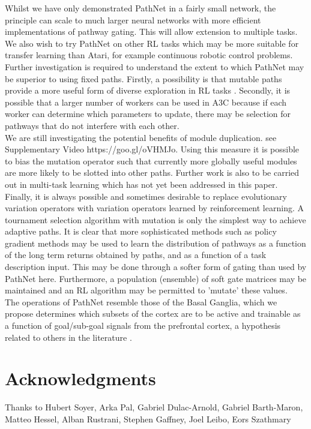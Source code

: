 \documentclass{sig-alternate-05-2015}
\begin{document}
Whilst we have only demonstrated PathNet in a fairly small network, the principle can scale to much larger neural networks with more efficient implementations of pathway gating. This will allow extension to multiple tasks. We also wish to try PathNet on other RL tasks which may be more suitable for transfer learning than Atari, for example continuous robotic control problems. Further investigation is required to understand the extent to which PathNet may be superior to using fixed paths. Firstly, a possibility is that mutable paths provide a more useful form of diverse exploration in RL tasks \cite{osband2016deep}. Secondly, it is possible that a larger number of workers can be used in A3C because if each worker can determine which parameters to update, there may be selection for pathways that do not interfere with each other.\\

We are still investigating the potential benefits of module duplication. see Supplementary Video https://goo.gl/oVHMJo. Using this measure it is possible to bias the mutation operator such that currently more globally useful modules are more likely to be slotted into other paths. Further work is also to be carried out in multi-task learning which has not yet been addressed in this paper. \\

Finally, it is always possible and sometimes desirable to replace evolutionary variation operators with variation operators learned by reinforcement learning. A tournament selection algorithm with mutation is only the simplest way to achieve adaptive paths. It is clear that more sophisticated methods such as policy gradient methods may be used to learn the distribution of pathways as a function of the long term returns obtained by paths, and as a function of a task description input. This may be done through a softer form of gating than used by PathNet here. Furthermore, a population (ensemble) of soft gate matrices may be maintained and an RL algorithm may be permitted to 'mutate' these values. \\

The operations of PathNet resemble those of the Basal Ganglia, which we propose determines which subsets of the cortex are to be active and trainable as a function of goal/sub-goal signals from the prefrontal cortex, a hypothesis related to others in the literature \cite{hazy2007towards} \cite{o2006making} \cite{frank2001interactions}. \\



\section{Acknowledgments}
Thanks to Hubert Soyer, Arka Pal, Gabriel Dulac-Arnold, Gabriel Barth-Maron, Matteo Hessel, Alban Rustrani, Stephen Gaffney, Joel Leibo, Eors Szathmary  


  
\end{document}
